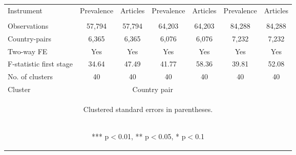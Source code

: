 \documentclass{article}
\begin{document}
\begin{table}[htbp]
{\begin{tabular}{lcccccc}
Instrument & Prevalence & Articles & Prevalence & Articles & Prevalence & Articles \\
\vspace{4pt} & \begin{footnotesize}\end{footnotesize} & \begin{footnotesize}\end{footnotesize} & \begin{footnotesize}\end{footnotesize} & \begin{footnotesize}\end{footnotesize} & \begin{footnotesize}\end{footnotesize} & \begin{footnotesize}\end{footnotesize} \\
Observations & 57,794 & 57,794 & 64,203 & 64,203 & 84,288 & 84,288 \\
Country-pairs & 6,365 & 6,365 & 6,076 & 6,076 & 7,232 & 7,232 \\
Two-way FE & Yes & Yes & Yes & Yes & Yes & Yes \\
F-statistic first stage & 34.64 & 47.49 & 41.77 & 58.36 & 39.81 & 52.08 \\
No. of clusters & 40 & 40 & 40 & 40 & 40 & 40 \\
Cluster & &\multicolumn{2}{c}{Country pair} \\ \hline
\multicolumn{7}{c}{\begin{footnotesize} Clustered standard errors in parentheses. \end{footnotesize} }\\
\multicolumn{7}{c}{\begin{footnotesize} *** p$<$0.01, ** p$<$0.05, * p$<$0.1\end{footnotesize}} \\\end{tabular}
}
\end{table}
\end{document}
